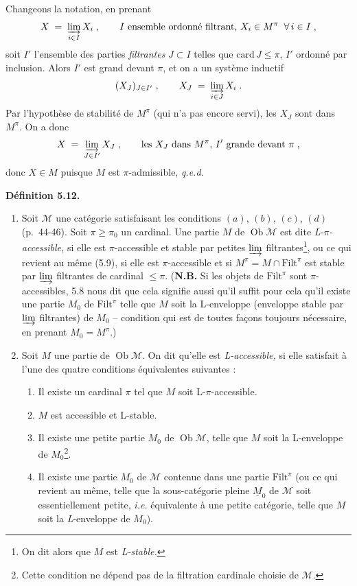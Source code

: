 \documentclass[11pt]{article}
\newcommand{\msp}[1]{\marginpar{\footnotesize [#1]}}
\newcommand{\M}{\mathcal{M}}
\newcommand{\Filt}{\mathrm{Filt}}
\newcommand{\Ob}{\operatorname{Ob}}
\begin{document}
Changeons la notation, en prenant
\[
X \;=\; \varinjlim_{i \in I} X_i \;, \qquad I \text{ ensemble ordonné filtrant, } X_i \in M^\pi \;\; \forall\, i \in I \;,
\]
soit $I'$ l'ensemble des parties \textit{filtrantes} $J \subset I$ telles que $\mathrm{card}\, J \leq \pi$, $I'$ ordonné par inclusion. Alors $I'$ est grand devant $\pi$, et on a un système inductif
\[
(X_J)_{J \in I'} \;, \qquad X_J \;=\; \varinjlim_{i \in J} X_i \;.
\]
Par l'hypothèse de stabilité de $M^\pi$ (qui n'a pas encore servi), les $X_J$ sont dans $M^\pi$. On a donc
\[
X \;=\; \varinjlim_{J \in I'} X_J \;, \qquad \text{les } X_J \text{ dans } M^\pi\text{, } I' \text{ grande devant } \pi \;,
\]
donc $X \in M$ puisque $M$ est $\pi$-admissible, \quad \textit{q.e.d.}

\msp{page 66}

\textbf{Définition 5.12.}
\begin{enumerate}[label={}]
\item[1)] Soit $\M$ une catégorie satisfaisant les conditions $(a)$, $(b)$, $(c)$, $(d)$ (p.~44-46). Soit $\pi \geq \pi_0$ un cardinal. Une partie $M$ de $\Ob\M$ est dite \textit{L-$\pi$-accessible,} si elle est $\pi$-accessible et stable par petites $\varinjlim$ filtrantes\footnote[24]{On dit alors que $M$ est \textit{L-stable.}}, ou ce qui revient au même (5.9), si elle est $\pi$-accessible et si $M^\pi = M \cap \Filt^\pi$ est stable par $\varinjlim$ filtrantes de cardinal $\leq \pi$. (\textbf{N.B.} Si les objets de $\Filt^\pi$ sont $\pi$-accessibles, 5.8 nous dit que cela signifie aussi qu'il suffit pour cela qu'il existe une partie $M_0$ de $\Filt^\pi$ telle que $M$ soit la L-enveloppe (enveloppe stable par $\varinjlim$ filtrantes) de $M_0$ -- condition qui est de toutes façons toujours nécessaire, en prenant $M_0 = M^\pi$.)
\item[2)] Soit $M$ une partie de $\Ob\M$. On dit qu'elle est \textit{L-accessible,} si elle satisfait à l'une des quatre conditions équivalentes suivantes :
\begin{enumerate}[label={}]
\item[\textit{a})] Il existe un cardinal $\pi$ tel que $M$ soit L-$\pi$-accessible.
\item[\textit{a}$'$)] $M$ est accessible et L-stable.
\item[\textit{b})] Il existe une petite partie $M_0$ de $\Ob\M$, telle que $M$ soit la L-enveloppe de $M_0$\footnote[25]{Cette condition ne dépend pas de la filtration cardinale choisie de $\M$.}.
\item[\textit{b}$'$)] Il existe une partie $M_0$ de $\M$ contenue dans une partie $\Filt^\pi$ (ou ce qui revient au même, telle que la sous-catégorie pleine $\underline{M}_0$ de $\M$ soit essentiellement petite, \textit{i.e.} équivalente à une petite catégorie, telle que $M$ soit la \textit{L}-enveloppe de $M_0$).
\end{enumerate}
\end{enumerate}
\end{document}
